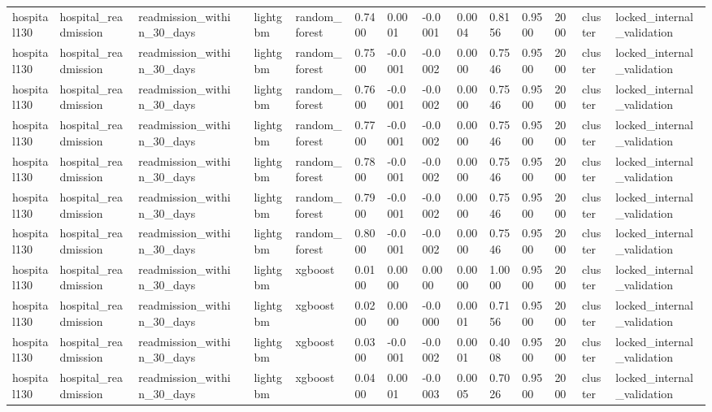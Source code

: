 \begin{tabular}{lllllllllllllll}
hospital130 & hospital\_readmission & readmission\_within\_30\_days &  & lightgbm & random\_forest & 0.7400 & 0.0001 & -0.0001 & 0.0004 & 0.8156 & 0.9500 & 2000 & cluster & locked\_internal\_validation \\
hospital130 & hospital\_readmission & readmission\_within\_30\_days &  & lightgbm & random\_forest & 0.7500 & -0.0001 & -0.0002 & 0.0000 & 0.7546 & 0.9500 & 2000 & cluster & locked\_internal\_validation \\
hospital130 & hospital\_readmission & readmission\_within\_30\_days &  & lightgbm & random\_forest & 0.7600 & -0.0001 & -0.0002 & 0.0000 & 0.7546 & 0.9500 & 2000 & cluster & locked\_internal\_validation \\
hospital130 & hospital\_readmission & readmission\_within\_30\_days &  & lightgbm & random\_forest & 0.7700 & -0.0001 & -0.0002 & 0.0000 & 0.7546 & 0.9500 & 2000 & cluster & locked\_internal\_validation \\
hospital130 & hospital\_readmission & readmission\_within\_30\_days &  & lightgbm & random\_forest & 0.7800 & -0.0001 & -0.0002 & 0.0000 & 0.7546 & 0.9500 & 2000 & cluster & locked\_internal\_validation \\
hospital130 & hospital\_readmission & readmission\_within\_30\_days &  & lightgbm & random\_forest & 0.7900 & -0.0001 & -0.0002 & 0.0000 & 0.7546 & 0.9500 & 2000 & cluster & locked\_internal\_validation \\
hospital130 & hospital\_readmission & readmission\_within\_30\_days &  & lightgbm & random\_forest & 0.8000 & -0.0001 & -0.0002 & 0.0000 & 0.7546 & 0.9500 & 2000 & cluster & locked\_internal\_validation \\
hospital130 & hospital\_readmission & readmission\_within\_30\_days &  & lightgbm & xgboost & 0.0100 & 0.0000 & 0.0000 & 0.0000 & 1.0000 & 0.9500 & 2000 & cluster & locked\_internal\_validation \\
hospital130 & hospital\_readmission & readmission\_within\_30\_days &  & lightgbm & xgboost & 0.0200 & 0.0000 & -0.0000 & 0.0001 & 0.7156 & 0.9500 & 2000 & cluster & locked\_internal\_validation \\
hospital130 & hospital\_readmission & readmission\_within\_30\_days &  & lightgbm & xgboost & 0.0300 & -0.0001 & -0.0002 & 0.0001 & 0.4008 & 0.9500 & 2000 & cluster & locked\_internal\_validation \\
hospital130 & hospital\_readmission & readmission\_within\_30\_days &  & lightgbm & xgboost & 0.0400 & 0.0001 & -0.0003 & 0.0005 & 0.7026 & 0.9500 & 2000 & cluster & locked\_internal\_validation \\

\end{tabular}
